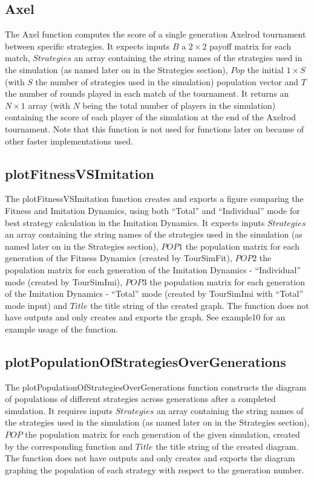 \documentclass[12pt]{article}
\begin{document}
\subsection{Axel}
The Axel function computes the score of a single generation Axelrod tournament between specific strategies. It expects inputs $B$ a $2 \times 2$ payoff matrix for each match, $Strategies$ an array containing the string names of the strategies used in the simulation (as named later on in the Strategies section), $Pop$ the initial $1 \times S$ (with $S$ the number of strategies used in the simulation) population vector and $T$ the number of rounds played in each match of the tournament. It returns an $N \times 1$ array (with $N$ being the total number of players in the simulation) containing the score of each player of the simulation at the end of the Axelrod tournament. Note that this function is not used for functions later on because of other faster implementations used.

\subsection{plotFitnessVSImitation}
The plotFitnessVSImitation function creates and exports a figure comparing the Fitness and Imitation Dynamics, using both ``Total'' and ``Individual'' mode for best strategy calculation in the Imitation Dynamics. It expects inputs $Strategies$ an array containing the string names of the strategies used in the simulation (as named later on in the Strategies section), $POP1$ the population matrix for each generation of the Fitness Dynamics (created by TourSimFit), $POP2$ the population matrix for each generation of the Imitation Dynamics - ``Individual'' mode (created by TourSimImi), $POP3$ the population matrix for each generation of the Imitation Dynamics - ``Total'' mode (created by TourSimImi with ``Total'' mode input) and $Title$ the title string of the created graph. The function does not have outputs and only creates and exports the graph. See example10 for an example usage of the function.

\subsection{plotPopulationOfStrategiesOverGenerations}
The plotPopulationOfStrategiesOverGenerations function constructs the diagram of populations of different strategies across generations after a completed simulation. It requires inputs $Strategies$ an array containing the string names of the strategies used in the simulation (as named later on in the Strategies section), $POP$ the population matrix for each generation of the given simulation, created by the corresponding function and $Title$ the title string of the created diagram. The function does not have outputs and only creates and exports the diagram graphing the population of each strategy with respect to the generation number.
\end{document}
